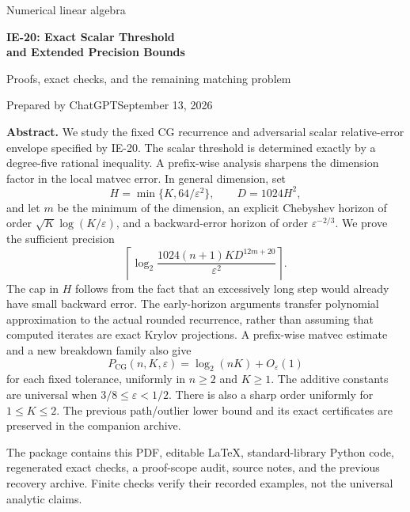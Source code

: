 \documentclass[11pt]{article}
\theoremstyle{remark}\newtheorem{remark}[theorem]{Remark}
\newcommand{\PCG}{P_{\mathrm{CG}}}
\newcommand{\eps}{\varepsilon}
\begin{document}
\hypersetup{pageanchor=false}
\begin{titlepage}
\vspace*{12mm}
{\large Numerical linear algebra\par}
\vspace{7mm}
{\LARGE\bfseries IE-20: Exact Scalar Threshold\\[3pt]and Extended Precision Bounds\par}
\vspace{7mm}
{\large Proofs, exact checks, and the remaining matching problem\par}
\vspace{10mm}
Prepared by ChatGPT\hfill September 13, 2026
\vspace{10mm}


\vspace{8mm}
\textbf{Abstract.}
We study the fixed CG recurrence and adversarial scalar relative-error
envelope specified by IE-20. The scalar threshold is determined exactly by
a degree-five rational inequality. A prefix-wise analysis sharpens the
dimension factor in the local matvec error. In general dimension, set
\[
H=\min\{K,64/\eps^2\},\qquad D=1024H^2,
\]
and let $m$ be the minimum of the dimension, an explicit Chebyshev horizon
of order $\sqrt K\log(K/\eps)$, and a backward-error horizon of order
$\eps^{-2/3}$. We prove the sufficient precision
\[
\left\lceil\log_2\frac{1024(n+1)K D^{12m+20}}{\eps^2}\right\rceil.
\]
The cap in $H$ follows from the fact that an excessively long step would
already have small backward error. The early-horizon arguments transfer
polynomial approximation to the actual rounded recurrence, rather than
assuming that computed iterates are exact Krylov projections.
A prefix-wise matvec estimate and a new breakdown family also give
\[
\PCG(n,K,\eps)=\log_2(nK)+O_{\eps}(1)
\]
for each fixed tolerance, uniformly in $n\ge2$ and $K\ge1$.
The additive constants are universal when $3/8\le\eps<1/2$.
There is also a sharp order uniformly for $1\le K\le2$. The previous path/outlier lower
bound and its exact certificates are preserved in the companion archive.

\vfill
\small
The package contains this PDF, editable \LaTeX, standard-library Python
code, regenerated exact checks, a proof-scope audit, source notes, and the
previous recovery archive. Finite checks verify their recorded examples,
not the universal analytic claims.
\end{titlepage}
\hypersetup{pageanchor=true}
\tableofcontents
\newpage
{}
\end{document}
